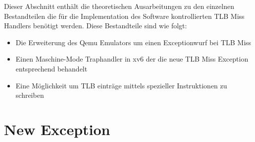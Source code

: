 Dieser Abschnitt enthält die theoretischen Ausarbeitungen zu den einzelnen Bestandteilen die für
die Implementation des Software kontrollierten TLB Miss Handlers benötigt werden. Diese Bestandteile
sind wie folgt:
\begin{itemize}
    \item Die Erweiterung des Qemu Emulators um einen Exceptionwurf bei TLB Miss
    \item Einen Maschine-Mode Traphandler in xv6 der die neue TLB Miss Exception entsprechend behandelt
    \item Eine Möglichkeit um TLB einträge mittels spezieller Instruktionen zu schreiben
\end{itemize}








\section{New Exception}


